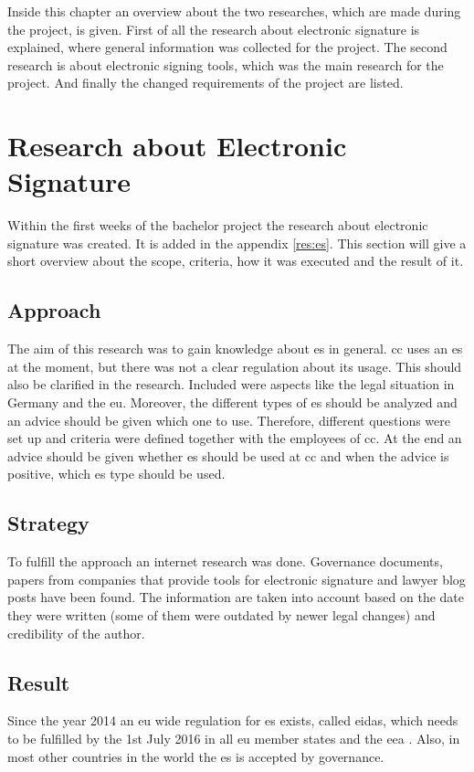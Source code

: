 Inside this chapter an overview about the two researches, which are made during the project, is given. First of all the research about electronic signature is explained, where general information was collected for the project. The second research is about electronic signing tools, which was the main research for the project. And finally the changed requirements of the project are listed.

\section{Research about Electronic Signature}
Within the first weeks of the bachelor project the research about electronic signature was created. It is added in the appendix \ref{res:es}. This section will give a short overview about the scope, criteria, how it was executed and the result of it.

\subsection{Approach}
The aim of this research was to gain knowledge about \gls{es} in general. \Gls{cc} uses an \gls{es} at the moment, but there was not a clear regulation about its usage. This should also be clarified in the research. Included were aspects like the legal situation in Germany and the \gls{eu}. Moreover, the different types of \gls{es} should be analyzed and an advice should be given which one to use. Therefore, different questions were set up and criteria were defined together with the employees of \gls{cc}. At the end an advice should be given whether \gls{es} should be used at \gls{cc} and when the advice is positive, which \gls{es} type should be used.

\subsection{Strategy}
To fulfill the approach an internet research was done. Governance documents, papers from companies that provide tools for electronic signature and lawyer blog posts have been found. The information are taken into account based on the date they were written (some of them were outdated by newer legal changes) and credibility of the author.


\subsection{Result}
Since the year 2014 an \gls{eu} wide regulation for \gls{es} exists, called \gls{eidas}, which needs to be fulfilled by the 1st July 2016 in all \gls{eu} member states and the \gls{eea} \parencite{BundesministeriumInneren2018,Steffens2018eIDAS}. Also, in most other countries in the world the \gls{es} is accepted by governance. 

